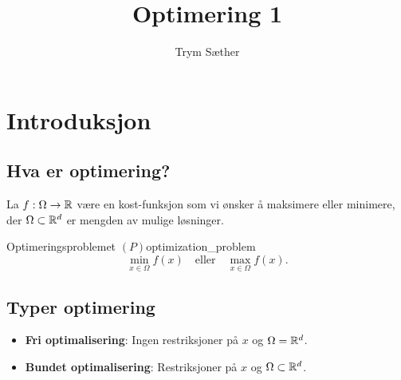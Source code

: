 \documentclass[10pt, a4paper]{report}
\begin{document}
\title{Optimering 1}

\author{Trym Sæther}

\maketitle

\tableofcontents

\newpage

\chapter{Introduksjon}

\section{Hva er optimering?}
La \(f: \Omega \to \mathbb{R}\) være en kost-funksjon som vi ønsker å maksimere eller minimere, der \(\Omega \subset \mathbb{R}^d\) er mengden av mulige løsninger.

\begin{definition}{Optimeringsproblemet \((P)\)}{optimization_problem}
  \[
    \min_{x \in \Omega} f(x) \quad \text{eller} \quad \max_{x \in \Omega} f(x).
  \]

\end{definition}

\section{Typer optimering}

\begin{itemize}
  \item \textbf{Fri optimalisering}: Ingen restriksjoner på \(x\) og \(\Omega = \mathbb{R}^d\).
  \item \textbf{Bundet optimalisering}: Restriksjoner på \(x\) og \(\Omega \subset \mathbb{R}^d\).
\end{itemize}



\clearpage


\clearpage




\end{document}

